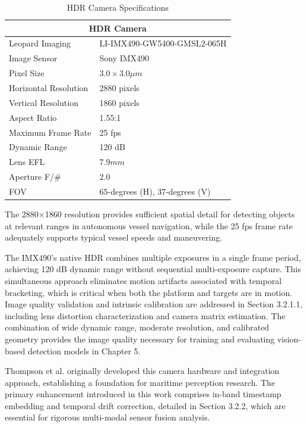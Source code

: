 \documentclass{erauthesis}
\begin{document}
\begin{table}[htpb]
\centering
\caption{HDR Camera Specifications}
\begin{tabular}{ll}
\hline
\multicolumn{2}{c}{HDR Camera}\\
\hline
\hline
Leopard Imaging & LI-IMX490-GW5400-GMSL2-065H \\
Image Sensor & Sony IMX490 \\
Pixel Size & $3.0 \times 3.0 \mu m$ \\
Horizontal Resolution & 2880 pixels \\
Vertical Resolution & 1860 pixels \\
Aspect Ratio & 1.55:1 \\
Maximum Frame Rate & 25 fps \\
Dynamic Range & 120 dB \\
Lens \Ac{EFL} & $7.9 mm$\\
Aperture F/\# & $2.0$ \\
\Ac{FOV} & 65-degrees (H), 37-degrees (V) \\
\hline
\end{tabular}
\label{tab:hdr_camera_specs}
\end{table}

The 2880×1860 resolution provides sufficient spatial detail for detecting objects at relevant ranges in autonomous vessel navigation, while the 25 fps frame rate adequately supports typical vessel speeds and maneuvering.

The IMX490's native \ac{HDR} combines multiple exposures in a single frame period, achieving 120 dB dynamic range without sequential multi-exposure capture.
This simultaneous approach eliminates motion artifacts associated with temporal bracketing, which is critical when both the platform and targets are in motion.
Image quality validation and intrinsic calibration are addressed in Section 3.2.1.1, including lens distortion characterization and camera matrix estimation.
The combination of wide dynamic range, moderate resolution, and calibrated geometry provides the image quality necessary for training and evaluating vision-based detection models in Chapter 5.

Thompson et al. \cite{thompson2023} originally developed this camera hardware and integration approach, establishing a foundation for maritime perception research.
The primary enhancement introduced in this work comprises in-band timestamp embedding and temporal drift correction, detailed in Section 3.2.2, which are essential for rigorous multi-modal sensor fusion analysis.
\end{document}

